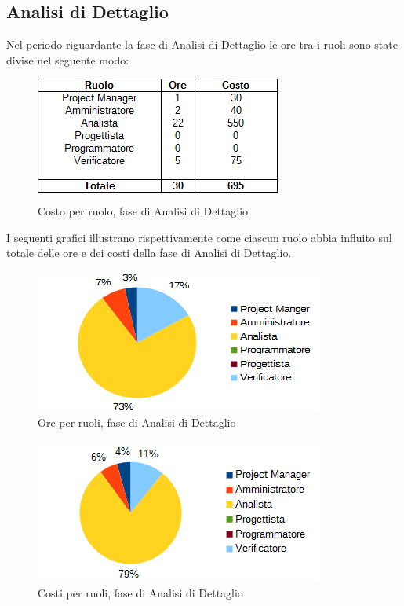 	\subsection{Analisi di Dettaglio}
	Nel periodo riguardante la fase di Analisi di Dettaglio le ore tra i ruoli sono state divise nel seguente modo: \\
	\begin{figure}[H]
		\centering
		\includegraphics[scale=0.75]{immagini/tabelle/analisi_dettaglio-costo.png}
		\caption{Costo per ruolo, fase di Analisi di Dettaglio}
	\end{figure}
	I seguenti grafici illustrano rispettivamente come ciascun ruolo abbia influito sul totale
delle ore e dei costi della fase di Analisi di Dettaglio. \\
	\begin{figure}[H]
		\centering
		\includegraphics[scale=1]{immagini/grafici/analisi_dettaglio-torta.png}
		\caption{Ore per ruoli, fase di Analisi di Dettaglio}
	\end{figure}
	\begin{figure}[H]
		\centering
		\includegraphics[scale=1]{immagini/grafici/analisi_dettaglio-torta-costo.png}
		\caption{Costi per ruoli, fase di Analisi di Dettaglio}
	\end{figure}
